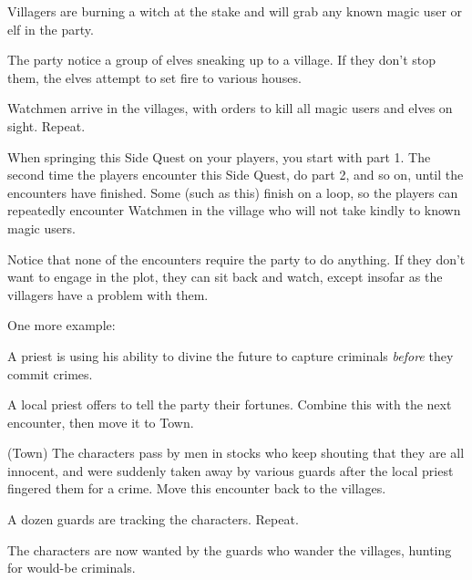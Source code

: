 \begin{multicols}{2}
\begin{list}{\Square}{}
\item[\CheckedBox]{Villagers are burning a witch at the stake and will grab any known magic user or elf in the party.}

\item{The party notice a group of elves sneaking up to a village. If they don't stop them, the elves attempt to set fire to various houses.}

\item{Watchmen arrive in the villages, with orders to kill all magic users and elves on sight. Repeat.}

\end{list}

When springing this Side Quest on your players, you start with part 1.
The second time the players encounter this Side Quest, do part 2, and so on, until the encounters have finished.
Some (such as this) finish on a loop, so the players can repeatedly encounter Watchmen in the village who will not take kindly to known magic users.

Notice that none of the encounters require the party to do anything.
If they don't want to engage in the plot, they can sit back and watch, except insofar as the villagers have a problem with them.

One more example:

\begin{exampletext}

A priest is using his ability to divine the future to capture criminals \emph{before} they commit crimes.

\end{exampletext}

\begin{list}{\Square}{}

\item[\CheckedBox]{A local priest offers to tell the party their fortunes.  Combine this with the next encounter, then move it to Town.}

\item{(Town) The characters pass by men in stocks who keep shouting that they are all innocent, and were suddenly taken away by various guards after the local priest fingered them for a crime.  Move this encounter back to the villages.}

\item{A dozen guards are tracking the characters. Repeat.}

\end{list}

The characters are now wanted by the guards who wander the villages, hunting for would-be criminals.


\end{multicols}
